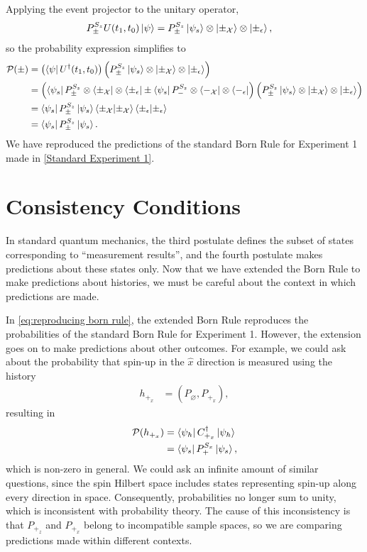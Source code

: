 Applying the event projector to the unitary operator,
\begin{align}
  P^{S_z}_\pm U(t_1, t_0) \ket{\psi} &= P^{S_z}_\pm \ket{\psi_s} \otimes \ket{\pm_\mathcal{X}} \otimes \ket{\pm_\epsilon},
\end{align}
so the probability expression simplifies to
\begin{align} \label{eq:reproducing born rule}
  \mathcal{P}(\pm) &= \left(\bra{\psi}  U^\dagger(t_1, t_0)\right) \left( P^{S_z}_\pm \ket{\psi_s} \otimes \ket{\pm_\mathcal{X}} \otimes \ket{\pm_\epsilon}\right) \\ \nonumber
   &= \left(\bra{\psi_s}P^{S_z}_\pm \otimes \bra{\pm_\mathcal{X}} \otimes \bra{\pm_\epsilon} \pm \bra{\psi_s}P^{S_z}_- \otimes \bra{-_\mathcal{X}} \otimes \bra{-_\epsilon} \right) \left( P^{S_z}_\pm \ket{\psi_s} \otimes \ket{\pm_\mathcal{X}} \otimes \ket{\pm_\epsilon}\right) \\ \nonumber
   &= \bra{\psi_s} P^{S_z}_\pm \ket{\psi_s} \braket{\pm_\mathcal{X}|\pm_\mathcal{X}} \braket{\pm_\epsilon|\pm_\epsilon} \\ \nonumber
   &= \bra{\psi_s} P^{S_z}_\pm \ket{\psi_s}.
\end{align}
We have reproduced the predictions of the standard Born Rule for Experiment 1 made in \autoref{Standard Experiment 1}.

\section{Consistency Conditions}

In standard quantum mechanics, the third postulate defines the subset of states corresponding to ``measurement results'', and the fourth postulate makes predictions about these states only. Now that we have extended the Born Rule to make predictions about histories, we must be careful about the context in which predictions are made.

In \autoref{eq:reproducing born rule}, the extended Born Rule reproduces the probabilities of the standard Born Rule for Experiment 1. However, the extension goes on to make predictions about other outcomes. For example, we could ask about the probability that spin-up in the $\hat{x}$ direction is measured using the history
\begin{align}
  h_{+_x} &= (P_\varnothing ,P_{+_x}),
\end{align}
resulting in
\begin{align}
  \mathcal{P}(h_{+_x}) &= \bra{\psi_h} C^\dagger_{+_x} \ket{\psi_h}  \\ \nonumber
  &= \bra{\psi_s} P^{S_x}_+ \ket{\psi_s},
\end{align}
which is non-zero in general. We could ask an infinite amount of similar questions, since the spin Hilbert space includes states representing spin-up along every direction in space. Consequently, probabilities no longer sum to unity, which is inconsistent with probability theory. The cause of this inconsistency is that $P_{+_z}$ and $P_{+_x}$ belong to incompatible sample spaces, so we are comparing predictions made within different contexts.

